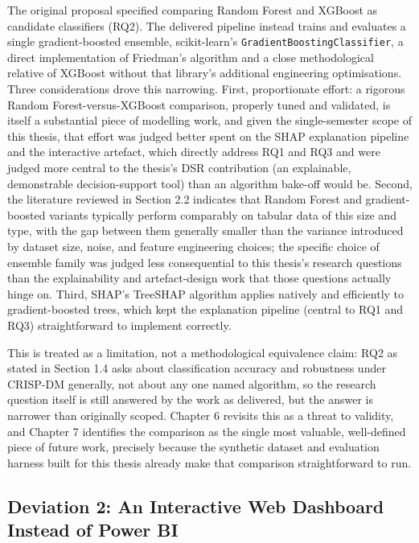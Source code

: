 The original proposal specified comparing Random Forest and XGBoost as
candidate classifiers (RQ2). The delivered pipeline instead trains and
evaluates a single gradient-boosted ensemble, scikit-learn's
\texttt{GradientBoostingClassifier}, a direct implementation of
Friedman's \citeyearpar{friedman2001greedy} algorithm and a close
methodological relative of XGBoost \citep{chen2016xgboost} without that
library's additional engineering optimisations. Three considerations
drove this narrowing. First, proportionate effort: a rigorous Random
Forest-versus-XGBoost comparison, properly tuned and validated, is
itself a substantial piece of modelling work, and given the
single-semester scope of this thesis, that effort was judged better
spent on the SHAP explanation pipeline and the interactive artefact,
which directly address RQ1 and RQ3 and were judged more central to the
thesis's DSR contribution (an explainable, demonstrable decision-support
tool) than an algorithm bake-off would be. Second, the literature
reviewed in Section 2.2 indicates that Random Forest and
gradient-boosted variants typically perform comparably on tabular data
of this size and type, with the gap between them generally smaller than
the variance introduced by dataset size, noise, and feature engineering
choices; the specific choice of ensemble family was judged less
consequential to this thesis's research questions than the
explainability and artefact-design work that those questions actually
hinge on. Third, SHAP's TreeSHAP algorithm \citep{lundberg2017unified}
applies natively and efficiently to gradient-boosted trees, which kept
the explanation pipeline (central to RQ1 and RQ3) straightforward to
implement correctly.

This is treated as a limitation, not a methodological equivalence claim:
RQ2 as stated in Section 1.4 asks about classification accuracy and
robustness under CRISP-DM generally, not about any one named algorithm,
so the research question itself is still answered by the work as
delivered, but the answer is narrower than originally scoped. Chapter 6
revisits this as a threat to validity, and Chapter 7 identifies the
comparison as the single most valuable, well-defined piece of future
work, precisely because the synthetic dataset and evaluation harness
built for this thesis already make that comparison straightforward to
run.

\hypertarget{deviation-2-an-interactive-web-dashboard-instead-of-power-bi}{%
\subsection{Deviation 2: An Interactive Web Dashboard Instead of Power
BI}\label{deviation-2-an-interactive-web-dashboard-instead-of-power-bi}}

